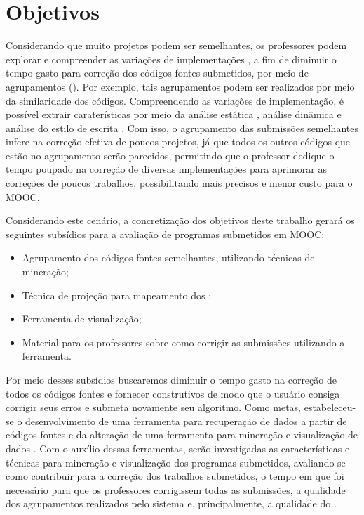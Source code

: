 \chapter{Objetivos}

Considerando que muito projetos podem ser semelhantes, os professores podem explorar
e compreender as variações de implementações \cite{Yin:2015}, a fim de diminuir
o tempo gasto para correção dos códigos-fontes submetidos, por meio de agrupamentos
(). Por exemplo, tais agrupamentos podem ser realizados por meio
da similaridade dos códigos. Compreendendo as variações de implementação, é possível
extrair caraterísticas por meio da análise estática \cite{Yin:2015,Glassman:2014,Taherkhani:2012},
análise dinâmica \cite{Glassman:2015} e análise do estilo de escrita \cite{Wei2015}.
Com	isso, o agrupamento das submissões semelhantes infere na correção efetiva de
poucos projetos, já que todos os outros códigos que estão no agrupamento serão
parecidos, permitindo que o professor dedique o tempo poupado na correção de diversas
implementações para aprimorar as correções de poucos trabalhos, possibilitando
 mais precisos e menor custo para o \acs{MOOC}.

Considerando este cenário, a concretização dos objetivos deste trabalho gerará
os seguintes subsídios para a avaliação de programas submetidos em \acs{MOOC}:  %
\begin{itemize}
	\item Agrupamento dos códigos-fontes semelhantes, utilizando técnicas de mineração;
	\item Técnica de projeção para mapeamento dos ;
	\item Ferramenta de visualização;
	\item Material para os professores sobre como corrigir as submissões utilizando a ferramenta.
\end{itemize}

Por meio desses subsídios buscaremos diminuir o tempo gasto na correção de todos os códigos
fontes e  fornecer  construtivos de modo que o usuário consiga
corrigir seus erros e submeta novamente seu algoritmo. Como metas, estabeleceu-se
o desenvolvimento de uma ferramenta para recuperação de dados a partir de
códigos-fontes e da alteração de uma ferramenta para mineração e visualização de
dados \cite{Alencar-etal:2012}. Com o auxílio dessas ferramentas, serão investigadas as
características e técnicas para mineração e visualização dos programas submetidos,
avaliando-se como contribuir para a correção dos trabalhos submetidos, o tempo em
que foi necessário para que os professores corrigissem todas as submissões, a
qualidade dos agrupamentos realizados pelo sistema e, principalmente, a
qualidade do .